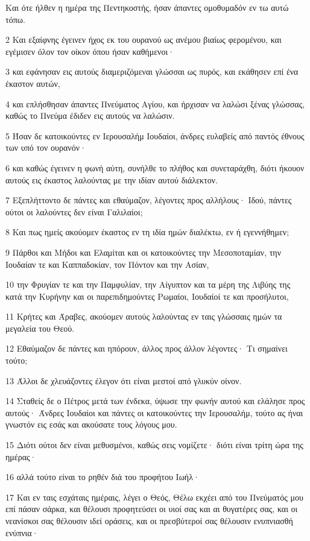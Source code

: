 \par Και ότε ήλθεν η ημέρα της Πεντηκοστής, ήσαν άπαντες ομοθυμαδόν εν τω αυτώ τόπω.
\par 2 Και εξαίφνης έγεινεν ήχος εκ του ουρανού ως ανέμου βιαίως φερομένου, και εγέμισεν όλον τον οίκον όπου ήσαν καθήμενοι·
\par 3 και εφάνησαν εις αυτούς διαμεριζόμεναι γλώσσαι ως πυρός, και εκάθησεν επί ένα έκαστον αυτών,
\par 4 και επλήσθησαν άπαντες Πνεύματος Αγίου, και ήρχισαν να λαλώσι ξένας γλώσσας, καθώς το Πνεύμα έδιδεν εις αυτούς να λαλώσιν.
\par 5 Ήσαν δε κατοικούντες εν Ιερουσαλήμ Ιουδαίοι, άνδρες ευλαβείς από παντός έθνους των υπό τον ουρανόν·
\par 6 και καθώς έγεινεν η φωνή αύτη, συνήλθε το πλήθος και συνεταράχθη, διότι ήκουον αυτούς εις έκαστος λαλούντας με την ιδίαν αυτού διάλεκτον.
\par 7 Εξεπλήττοντο δε πάντες και εθαύμαζον, λέγοντες προς αλλήλους· Ιδού, πάντες ούτοι οι λαλούντες δεν είναι Γαλιλαίοι;
\par 8 Και πως ημείς ακούομεν έκαστος εν τη ιδία ημών διαλέκτω, εν ή εγεννήθημεν;
\par 9 Πάρθοι και Μήδοι και Ελαμίται και οι κατοικούντες την Μεσοποταμίαν, την Ιουδαίαν τε και Καππαδοκίαν, τον Πόντον και την Ασίαν,
\par 10 την Φρυγίαν τε και την Παμφυλίαν, την Αίγυπτον και τα μέρη της Λιβύης της κατά την Κυρήνην και οι παρεπιδημούντες Ρωμαίοι, Ιουδαίοί τε και προσήλυτοι,
\par 11 Κρήτες και Άραβες, ακούομεν αυτούς λαλούντας εν ταις γλώσσαις ημών τα μεγαλεία του Θεού.
\par 12 Εθαύμαζον δε πάντες και ηπόρουν, άλλος προς άλλον λέγοντες· Τι σημαίνει τούτο;
\par 13 Άλλοι δε χλευάζοντες έλεγον ότι είναι μεστοί από γλυκύν οίνον.
\par 14 Σταθείς δε ο Πέτρος μετά των ένδεκα, ύψωσε την φωνήν αυτού και ελάλησε προς αυτούς· Άνδρες Ιουδαίοι και πάντες οι κατοικούντες την Ιερουσαλήμ, τούτο ας ήναι γνωστόν εις εσάς και ακούσατε τους λόγους μου.
\par 15 Διότι ούτοι δεν είναι μεθυσμένοι, καθώς σεις νομίζετε· διότι είναι τρίτη ώρα της ημέρας·
\par 16 αλλά τούτο είναι το ρηθέν διά του προφήτου Ιωήλ·
\par 17 Και εν ταις εσχάταις ημέραις, λέγει ο Θεός, Θέλω εκχέει από του Πνεύματός μου επί πάσαν σάρκα, και θέλουσι προφητεύσει οι υιοί σας και αι θυγατέρες σας, και οι νεανίσκοι σας θέλουσιν ιδεί οράσεις, και οι πρεσβύτεροί σας θέλουσιν ενυπνιασθή ενύπνια·
